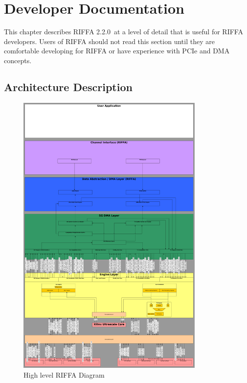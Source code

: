 \documentclass{refrep}
\newcommand{\RIFFAVer}{2.2.0}
\begin{document}
\chapter{Developer Documentation}
This chapter describes RIFFA \RIFFAVer~at a level of detail that is useful for
RIFFA developers. Users of RIFFA should not read this section until they are
comfortable developing for RIFFA or have experience with PCIe and DMA
concepts. 
\section{Architecture Description}
\begin{figure}[H]
\includegraphics[width=350px,center]{RIFFA.pdf}
  \caption{High level RIFFA Diagram}
  \label{Fig:Developer:HighLevel:Full}
\end{figure}
\end{document}
